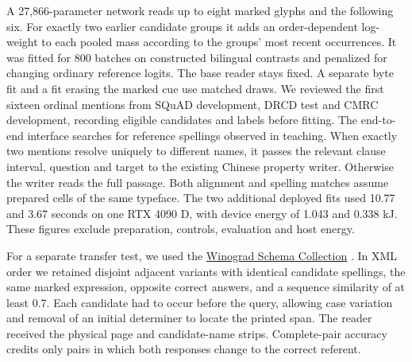 \documentclass[12pt,a4paper]{article}
\providecommand{\DIFadd}[1]{{\protect\color{blue} \sf #1}} %
\begin{document}
\DIFadd{A 27,866-parameter network reads up to eight marked glyphs and the following six. For exactly two earlier candidate groups it adds an order-dependent log-weight to each pooled mass according to the groups' most recent occurrences. It was fitted for 800 batches on constructed bilingual contrasts and penalized for changing ordinary reference logits. The base reader stays fixed. A separate byte fit and a fit erasing the marked cue use matched draws. We reviewed the first sixteen ordinal mentions from SQuAD development, DRCD test and CMRC development, recording eligible candidates and labels before fitting. The end-to-end interface searches for reference spellings observed in teaching. When exactly two mentions resolve uniquely to different names, it passes the relevant clause interval, question and target to the existing Chinese property writer. Otherwise the writer reads the full passage. Both alignment and spelling matches assume prepared cells of the same typeface. The two additional deployed fits used 10.77 and 3.67 seconds on one RTX 4090 D, with device energy of 1.043 and 0.338 kJ. These figures exclude preparation, controls, evaluation and host energy.
}

\DIFadd{For a separate transfer test, we used the }\href{https://cs.nyu.edu/~davise/papers/WinogradSchemas/WSCollection.html}{\DIFadd{Winograd Schema Collection}}\DIFadd{. In XML order we retained disjoint adjacent variants with identical candidate spellings, the same marked expression, opposite correct answers, and a sequence similarity of at least 0.7. Each candidate had to occur before the query, allowing case variation and removal of an initial determiner to locate the printed span. The reader received the physical page and candidate-name strips. Complete-pair accuracy credits only pairs in which both responses change to the correct referent.
}
\end{document}
